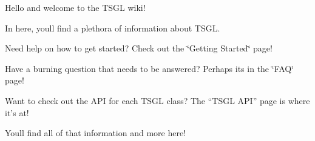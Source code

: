 Hello and welcome to the T\+S\+G\+L wiki!

In here, you\textquotesingle{}ll find a plethora of information about T\+S\+G\+L.

Need help on how to get started? Check out the \char`\"{}\+Getting Started\char`\"{} page!

Have a burning question that needs to be answered? Perhaps its in the \char`\"{}\+F\+A\+Q\char`\"{} page!

Want to check out the A\+P\+I for each T\+S\+G\+L class? The “\+T\+S\+G\+L A\+P\+I” page is where it’s at!

You\textquotesingle{}ll find all of that information and more here! 